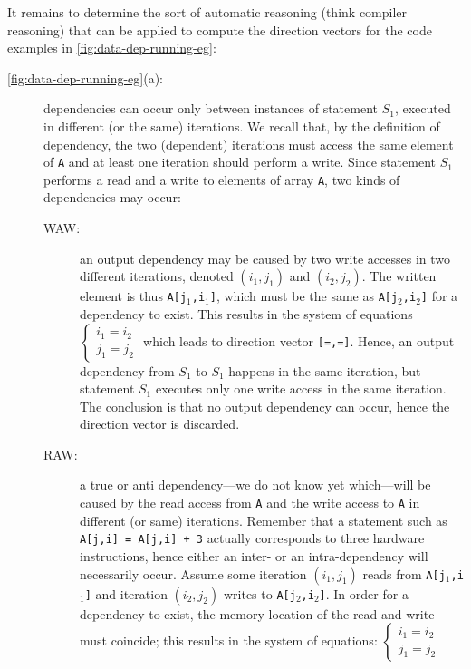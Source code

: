 \documentclass[acmsmall,review]{acmart}\settopmatter{printfolios=true,printccs=false,printacmref=false}
\begin{document}
It remains to determine the sort of automatic reasoning 
(think compiler reasoning) that can be applied to compute
the direction vectors for the code examples in 
\cref{fig:data-dep-running-eg}:
\begin{description}
    \item[\cref{fig:data-dep-running-eg}(a):] dependencies
        can occur only between instances of statement $S_1$,
        executed in different (or the same) iterations.
        We recall that, by the definition of dependency,
        the two (dependent) iterations must access the same 
        element of {\tt A} and at least one iteration should 
        perform a write. 
        Since statement $S_1$ performs a read and a write to
        elements of array {\tt A}, two kinds of dependencies
        may occur:
    \begin{description}
        \item[WAW:] an output dependency may be caused by
        two write accesses in two different iterations,
        denoted $(i_1,j_1)$ and $(i_2,j_2)$. The written
        element is thus {\tt A[j$_1$,i$_1$]}, which must
        be the same as {\tt A[j$_2$,i$_2$]} for a dependency
        to exist. This results in
        the system of equations $\begin{cases}i_1 = i_2\\j_1 = j_2\end{cases}$
        which leads to direction vector {\tt[=,=]}.
        Hence, an output dependency from $S_1$ to $S_1$ 
        happens in the same iteration, but statement $S_1$
        executes only one write access in the same iteration.
        The conclusion is that no output dependency can occur,
        hence the direction vector is discarded.
        \item[RAW:] a true or anti dependency---we do not 
        know yet which---will be caused by the read access from 
        {\tt A} and the write access to {\tt A} in different 
        (or same) iterations. Remember that a statement such
        as {\tt A[j,i] = A[j,i] + 3} actually corresponds to
        three hardware instructions, hence either an inter- or
        an intra-dependency will necessarily occur.
        Assume some iteration $(i_1, j_1)$ reads from 
        {\tt A[j$_1$,i$_1$]} and iteration $(i_2,j_2)$ 
        writes to {\tt A[j$_2$,i$_2$]}.
        In order for a dependency to exist, the memory location
        of the read and write must coincide; this results
        in the system of equations: 
        $\begin{cases}i_1 = i_2\\j_1 = j_2\end{cases}$

\end{description}
\end{description}
\end{document}
